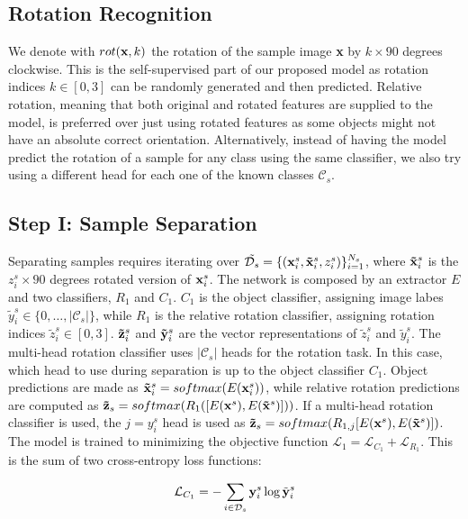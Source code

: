 \documentclass[10pt,twocolumn,letterpaper]{article}
\begin{document}
\subsection{Rotation Recognition}

We denote with $rot({\bf x}, k)$ the rotation of the sample image {\bf x} by $k\times 90$ degrees clockwise.
This is the self-supervised part of our proposed model as rotation indices $k \in [0, 3]$ can be randomly generated and then predicted.
Relative rotation,
meaning that both original and rotated features are supplied to the model,
is preferred over just using rotated features as some objects might not have an absolute correct orientation.
Alternatively, 
instead of having the model predict the rotation of a sample for any class using the same classifier, 
we also try using a different head for each one of the known classes $\mathcal{C}_s$.

\subsection{Step I: Sample Separation}

Separating samples requires iterating over $\tilde{\mathcal{D}_s} = \{({\bf x}_i^s, {\bf \tilde x}_i^s, z_i^s)\}_{i=1}^{N_s}$,
where ${\bf \tilde x}_i^s$ is the $z_i^s\times 90$ degrees rotated version of ${\bf x}_i^s$.
The network is composed by an extractor $E$ and two classifiers, 
$R_1$ and $C_1$.
$C_1$ is the object classifier, 
assigning image labes $\tilde{y}_i^s \in \{0, \dots, |\mathcal{C}_s|\}$,
while $R_1$ is the relative rotation classifier,
assigning rotation indices $\tilde{z}_i^s \in [0, 3]$.
${\bf\tilde{z}}_i^s$ and ${\bf\tilde{y}}_i^s$ are the vector representations of $\tilde{z}_i^s$ and $\tilde{y}_i^s$.
The multi-head rotation classifier uses $|\mathcal{C}_s|$ heads for the rotation task.
In this case, 
which head to use during separation is up to the object classifier $C_1$.
Object predictions are made as ${\bf\tilde{x}}_i^s = softmax(E({\bf x}_i^s))$,
while relative rotation predictions are computed as ${\bf \tilde z}_s = softmax(R_1([E({\bf x}^s), E({\bf\tilde x}^s)]))$.
If a multi-head rotation classifier is used,
the $j = y_i^s$ head is used as ${\bf\tilde{z}}_s = softmax(R_{1,j}[E({\bf x}^s), E({\bf\tilde{x}}^s)])$.
The model is trained to minimizing the objective function $\mathcal{L}_1 = \mathcal{L}_{C_1} + \mathcal{L}_{R_1}$.
This is the sum of two cross-entropy loss functions:

\begin{equation}
  \mathcal{L}_{C_1} = -\sum_{i\in\mathcal{D}_s} {\bf y}_i^s \log \tilde{\bf y}_i^s
  \label{eq:baseloss_class}
\end{equation}
\end{document}
